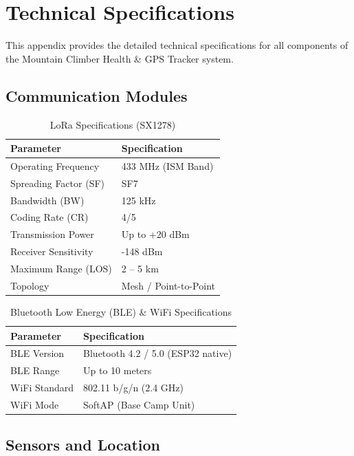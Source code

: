 \chapter{Technical Specifications}
\label{app:technical-specifications}

This appendix provides the detailed technical specifications for all components of the Mountain Climber Health \& GPS Tracker system.

\section{Communication Modules}

\begin{table}[htbp]
\centering
\caption{LoRa Specifications (SX1278)}
\label{tab:spec-lora}
\begin{tabular}{@{}ll@{}}
\toprule
\textbf{Parameter} & \textbf{Specification} \\ \midrule
Operating Frequency & 433 MHz (ISM Band) \\
Spreading Factor (SF) & SF7 \\
Bandwidth (BW) & 125 kHz \\
Coding Rate (CR) & 4/5 \\
Transmission Power & Up to +20 dBm \\
Receiver Sensitivity & -148 dBm \\
Maximum Range (LOS) & 2 -- 5 km \\
Topology & Mesh / Point-to-Point \\
\bottomrule
\end{tabular}
\end{table}

\begin{table}[htbp]
\centering
\caption{Bluetooth Low Energy (BLE) \& WiFi Specifications}
\label{tab:spec-ble-wifi}
\begin{tabular}{@{}ll@{}}
\toprule
\textbf{Parameter} & \textbf{Specification} \\ \midrule
BLE Version & Bluetooth 4.2 / 5.0 (ESP32 native) \\
BLE Range & Up to 10 meters \\
WiFi Standard & 802.11 b/g/n (2.4 GHz) \\
WiFi Mode & SoftAP (Base Camp Unit) \\
\bottomrule
\end{tabular}
\end{table}

\section{Sensors and Location}

